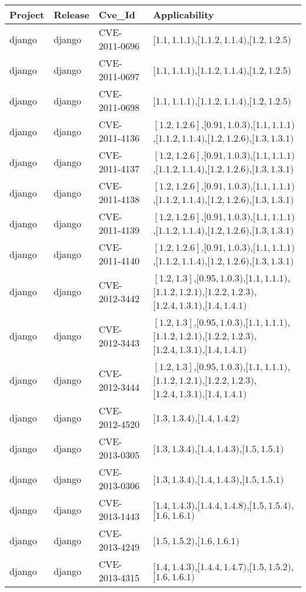 \begin{tabular}{llll}
\toprule
Project & Release & Cve_Id & Applicability \\
\midrule
django & django & CVE-2011-0696 & $[1.1,1.1.1)$,$[1.1.2,1.1.4)$,$[1.2,1.2.5)$ \\
django & django & CVE-2011-0697 & $[1.1,1.1.1)$,$[1.1.2,1.1.4)$,$[1.2,1.2.5)$ \\
django & django & CVE-2011-0698 & $[1.1,1.1.1)$,$[1.1.2,1.1.4)$,$[1.2,1.2.5)$ \\
django & django & CVE-2011-4136 & $[1.2,1.2.6]$,$[0.91,1.0.3)$,$[1.1,1.1.1)$,$[1.1.2,1.1.4)$,$[1.2,1.2.6)$,$[1.3,1.3.1)$ \\
django & django & CVE-2011-4137 & $[1.2,1.2.6]$,$[0.91,1.0.3)$,$[1.1,1.1.1)$,$[1.1.2,1.1.4)$,$[1.2,1.2.6)$,$[1.3,1.3.1)$ \\
django & django & CVE-2011-4138 & $[1.2,1.2.6]$,$[0.91,1.0.3)$,$[1.1,1.1.1)$,$[1.1.2,1.1.4)$,$[1.2,1.2.6)$,$[1.3,1.3.1)$ \\
django & django & CVE-2011-4139 & $[1.2,1.2.6]$,$[0.91,1.0.3)$,$[1.1,1.1.1)$,$[1.1.2,1.1.4)$,$[1.2,1.2.6)$,$[1.3,1.3.1)$ \\
django & django & CVE-2011-4140 & $[1.2,1.2.6]$,$[0.91,1.0.3)$,$[1.1,1.1.1)$,$[1.1.2,1.1.4)$,$[1.2,1.2.6)$,$[1.3,1.3.1)$ \\
django & django & CVE-2012-3442 & $[1.2,1.3]$,$[0.95,1.0.3)$,$[1.1,1.1.1)$,$[1.1.2,1.2.1)$,$[1.2.2,1.2.3)$,$[1.2.4,1.3.1)$,$[1.4,1.4.1)$ \\
django & django & CVE-2012-3443 & $[1.2,1.3]$,$[0.95,1.0.3)$,$[1.1,1.1.1)$,$[1.1.2,1.2.1)$,$[1.2.2,1.2.3)$,$[1.2.4,1.3.1)$,$[1.4,1.4.1)$ \\
django & django & CVE-2012-3444 & $[1.2,1.3]$,$[0.95,1.0.3)$,$[1.1,1.1.1)$,$[1.1.2,1.2.1)$,$[1.2.2,1.2.3)$,$[1.2.4,1.3.1)$,$[1.4,1.4.1)$ \\
django & django & CVE-2012-4520 & $[1.3,1.3.4)$,$[1.4,1.4.2)$ \\
django & django & CVE-2013-0305 & $[1.3,1.3.4)$,$[1.4,1.4.3)$,$[1.5,1.5.1)$ \\
django & django & CVE-2013-0306 & $[1.3,1.3.4)$,$[1.4,1.4.3)$,$[1.5,1.5.1)$ \\
django & django & CVE-2013-1443 & $[1.4,1.4.3)$,$[1.4.4,1.4.8)$,$[1.5,1.5.4)$,$[1.6,1.6.1)$ \\
django & django & CVE-2013-4249 & $[1.5,1.5.2)$,$[1.6,1.6.1)$ \\
django & django & CVE-2013-4315 & $[1.4,1.4.3)$,$[1.4.4,1.4.7)$,$[1.5,1.5.2)$,$[1.6,1.6.1)$ \\

\end{tabular}
